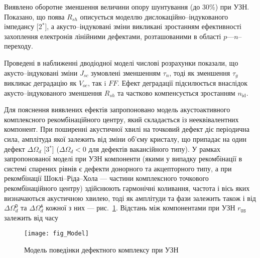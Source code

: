Виявлено оборотне зменшення величини  опору шунтування (до 30\%) при УЗН.
Показано, що поява $R_{sh}$ описується моделлю дислокаційно--індукованого імпедансу
[2$^*$], а акусто--індуковані зміни викликані зростанням ефективності захоплення електронів лінійними дефектами, розташованими в області $p$---$n$--переходу.

Проведені в наближенні дводіодної моделі числові розрахунки показали, що акусто--індуковані зміни $J_{sc}$ зумовлені зменшенням $\tau_{n}$,
тоді як зменшення $\tau_{g}$ викликає деградацію як $V_{oc}$, так i $F\!F$.
Ефект деградації підсилюється внаслідок акусто--індукованого зменшення $R_{sh}$ та частково компенсується зростанням $n_\mathrm{id}$.

Для пояснення виявлених ефектів запропоновано модель акустоактивного комплексного рекомбінаційного центру, який складається із нееквівалентних компонент.
При поширенні акустичної хвилі на точковий дефект діє періодична сила, амплітуда якої залежить від зміни об'єму кристалу, що припадає на один дефект $\Delta\Omega_d$
[3$^*$] ($\Delta\Omega_d<0$ для дефектів вакансійного типу).
У рамках запропонованої моделі при УЗН компоненти (якими у випадку рекомбінації в системі спарених рівнів є  дефекти донорного та акцепторного типу, а при рекомбінації Шоклі--Ріда--Хола --- частини комплексного точкового рекомбінаційного центру) здійснюють гармонічні коливання, частота і вісь яких
визначаються акустичною хвилею, тоді як амплітуди та фази залежить також і від  $\Delta\Omega_d^\mathtt{D}$ та
$\Delta\Omega_d^\mathtt{A}$ кожної з них --- рис.~\ref{fig_Model}.
Відстань між компонентами при УЗН $r_\mathtt{US}$ залежить від часу

\begin{figure}[b]
\center
\texttt{[image: fig\_Model]}
\caption{\label{fig_Model}
Модель поведінки дефектного комплексу при УЗН
}%
\end{figure}



